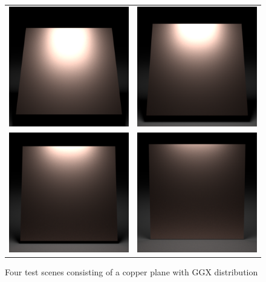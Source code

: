 \begin{figure}[h]
	\begin{tabular}{cc}
		\includegraphics[width=.45\linewidth]{img/ggx_copper_50.png}
		&
		\includegraphics[width=.45\linewidth]{img/ggx_copper_60.png} \\ 
		\includegraphics[width=.45\linewidth]{img/ggx_copper_70.png}
		&
		\includegraphics[width=.45\linewidth]{img/ggx_copper_80.png}
	\end{tabular}
	\caption{Four test scenes consisting of a copper plane with GGX distribution}
	\label{fig:ggx_copper}
\end{figure}

